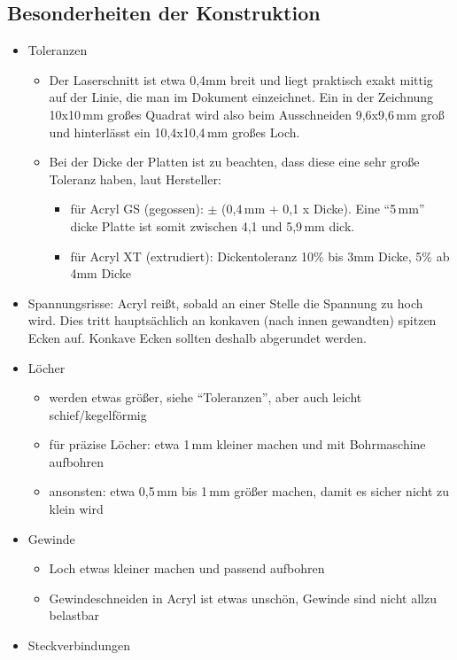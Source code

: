 \documentclass{\basedir/fablab-document}
\begin{document}
	\subsection{Besonderheiten der Konstruktion}
\begin{itemize}
  \item Toleranzen
	\begin{itemize}
	  \item Der Laserschnitt ist etwa 0,4mm breit und liegt praktisch exakt mittig auf der Linie,
		  die man im Dokument einzeichnet. Ein in der Zeichnung 10x10\,mm großes Quadrat wird also beim
		  Ausschneiden 9,6x9,6\,mm groß und hinterlässt ein 10,4x10,4\,mm großes Loch.
      \item Bei der Dicke der Platten ist zu beachten, dass diese eine sehr große Toleranz haben, laut Hersteller:
		\begin{itemize}
			\item für Acryl GS (gegossen): $\pm$ (0,4\,mm + 0,1 x Dicke). Eine \enquote{5\,mm} dicke Platte ist somit zwischen 4,1 und 5,9\,mm dick.
			\item für Acryl XT (extrudiert): Dickentoleranz 10\% bis 3mm Dicke, 5\% ab 4mm Dicke
		\end{itemize}
	\end{itemize}
  \item Spannungsrisse: Acryl reißt, sobald an einer Stelle die Spannung zu hoch wird. Dies tritt hauptsächlich an konkaven (nach innen gewandten) spitzen Ecken auf. Konkave Ecken sollten deshalb abgerundet werden.
  \item Löcher
	\begin{itemize}
		\item werden etwas größer, siehe \enquote{Toleranzen}, aber auch leicht schief/kegelförmig
		\item für präzise Löcher: etwa 1\,mm kleiner machen und mit Bohrmaschine aufbohren
		\item ansonsten: etwa 0,5\,mm bis 1\,mm größer machen, damit es sicher nicht zu klein wird
	\end{itemize}
  \item Gewinde
	\begin{itemize}
		\item Loch etwas kleiner machen und passend aufbohren
		\item Gewindeschneiden in Acryl ist etwas unschön, Gewinde sind nicht allzu belastbar
	\end{itemize}
  \item Steckverbindungen
	\begin{itemize}

\end{itemize}
\end{itemize}
\end{document}
